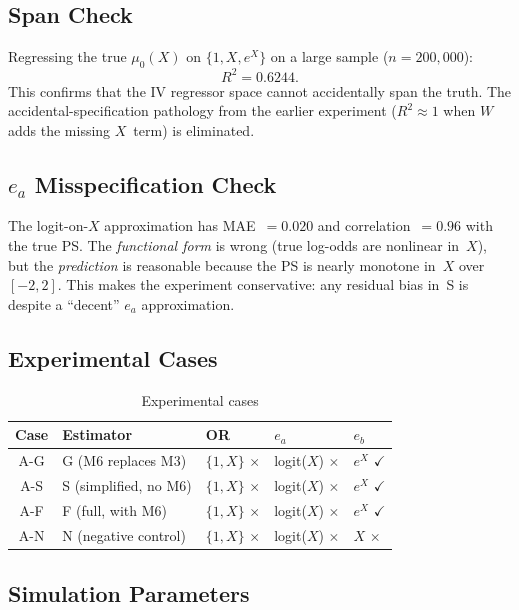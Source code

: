 \documentclass[11pt,letterpaper]{article}
\begin{document}
\subsection{Span Check}

Regressing the true $\mu_0(X)$ on $\{1, X, e^X\}$ on a
large sample ($n = 200{,}000$):
\[
  R^2 = 0.6244.
\]
This confirms that the IV regressor space cannot accidentally span
the truth.  The accidental-specification pathology from the earlier
experiment ($R^2 \approx 1$ when $W$ adds the missing $X$~term)
is eliminated.


\subsection{$e_a$ Misspecification Check}

The logit-on-$X$ approximation has MAE~$= 0.020$ and
correlation~$= 0.96$ with the true PS.  The \emph{functional form}
is wrong (true log-odds are nonlinear in~$X$), but the
\emph{prediction} is reasonable because the PS is nearly monotone
in~$X$ over $[-2,2]$.  This makes the experiment conservative:
any residual bias in~S is despite a ``decent'' $e_a$ approximation.


\subsection{Experimental Cases}

\begin{table}[H]
\centering
\caption{Experimental cases}
\label{tab:cases-surgical}
\begin{tabular}{cllll}
\toprule
\textbf{Case} & \textbf{Estimator} & \textbf{OR} & $e_a$ & $e_b$ \\
\midrule
A-G & G (M6 replaces M3) & $\{1, X\}$ $\times$ & logit($X$) $\times$ & $e^X$ $\checkmark$ \\
A-S & S (simplified, no M6) & $\{1, X\}$ $\times$ & logit($X$) $\times$ & $e^X$ $\checkmark$ \\
A-F & F (full, with M6) & $\{1, X\}$ $\times$ & logit($X$) $\times$ & $e^X$ $\checkmark$ \\
A-N & N (negative control) & $\{1, X\}$ $\times$ & logit($X$) $\times$ & $X$ $\times$ \\
\bottomrule
\end{tabular}
\end{table}

\subsection{Simulation Parameters}
\end{document}
